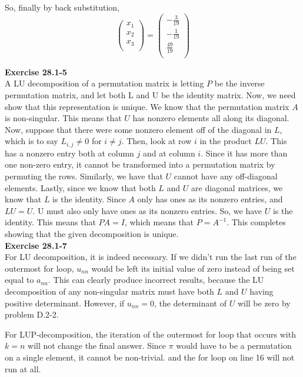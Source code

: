 \documentclass{article}
\begin{document}
So, finally by back substitution,
\[
  \left(\begin{array}{c}
 x_1\\
 x_2\\
 x_3\\
 \end{array}\right) 
=
  \left(\begin{array}{c}
 -\frac{3}{19}\\
 -\frac{1}{19}\\
 \frac{49}{19}\\
 \end{array}\right) 
\]



\noindent\textbf{Exercise 28.1-5}\\
A LU decomposition of a permutation matrix is letting $P$ be the inverse permutation matrix, and let both L and U be the identity matrix. Now, we need show that this representation is unique. We know that the permutation matrix $A$ is non-singular. This means that $U$ has nonzero elements all along its diagonal. Now, suppose that there were some nonzero element off of the diagonal in $L$, which is to say $L_{i,j}\neq 0$ for $i\neq j$. Then, look at row $i$ in the product $LU$. This has a nonzero entry both at column $j$ and at column $i$. Since it has more than one non-zero entry, it cannot be transformed into a permutation matrix by permuting the rows. Similarly, we have that $U$ cannot have any off-diagonal elements. Lastly, since we know that both $L$ and $U$ are diagonal matrices, we know that $L$ is the identity. Since $A$ only has ones as its nonzero entries, and $LU =U$. U must also only have ones as its nonzero entries. So, we have $U$ is the identity. This means that $PA =I$, which means that $P = A^{-1}$. This completes showing that the given decomposition is unique.\\



\noindent\textbf{Exercise 28.1-7}\\
For LU decomposition, it is indeed necessary. If we didn't run the last run of the outermost for loop, $u_{nn}$ would be left its initial value of zero instead of being set equal to $a_{nn}$. This can clearly produce incorrect results, because the LU decomposition of any non-singular matrix must have both $L$ and $U$ having positive determinant. However, if $u_{nn}=0$, the determinant of $U$ will be zero by problem D.2-2.

For LUP-decomposition, the iteration of the outermost for loop that occurs with $k=n$ will not change the final answer. Since $\pi$ would have to be a permutation on a single element, it cannot be non-trivial. and the for loop on line 16 will not run at all.\\
\end{document}
